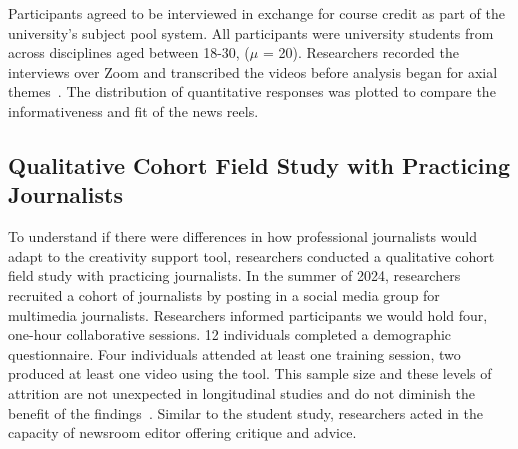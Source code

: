 Participants agreed to be interviewed in exchange for course credit as part of the university’s subject pool system. 
All participants were university students from across disciplines aged between 18-30, ($\mu$ = 20). 
Researchers recorded the interviews over Zoom and transcribed the videos before analysis began for axial themes~\cite{saldana2003longitudinal}. 
The distribution of quantitative responses was plotted to compare the informativeness and fit of the news reels. 

\subsection{Qualitative Cohort Field Study with Practicing Journalists} 
To understand if there were differences in how professional journalists would adapt to the creativity support tool, researchers conducted a qualitative cohort field study with practicing journalists. 
In the summer of 2024, researchers recruited a cohort of journalists by posting in a social media group for multimedia journalists.
Researchers informed participants we would hold four, one-hour collaborative sessions. 
12 individuals completed a demographic questionnaire. 
Four individuals attended at least one training session, two produced at least one video using the tool. 
This sample size and these levels of attrition are not unexpected in longitudinal  studies and do not diminish the benefit of the findings~\cite{saldana2003longitudinal}.
Similar to the student study, researchers acted in the capacity of newsroom editor offering critique and advice.
